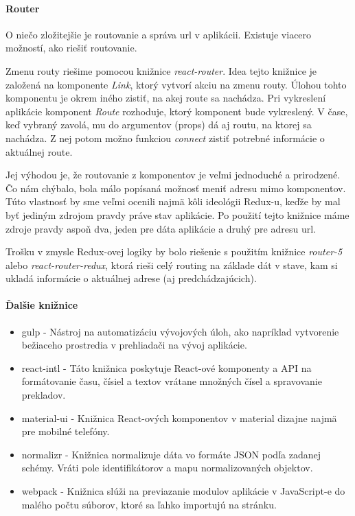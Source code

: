 \paragraph{Router}%
O niečo zložitejšie je routovanie a správa url v aplikácii. Existuje viacero možností, ako riešiť routovanie. 

Zmenu routy riešime pomocou knižnice \emph{react-router}. %
Idea tejto knižnice je založená na komponente \emph{Link}, ktorý vytvorí akciu na zmenu routy. Úlohou tohto komponentu je okrem iného zistiť, na akej route sa nachádza. 
Pri vykreslení aplikácie komponent \emph{Route} rozhoduje, ktorý komponent bude vykreslený. %
V čase, keď vybraný zavolá, mu do argumentov (props)
dá aj routu, na ktorej sa nachádza. Z nej potom možno funkciou \emph{connect} zistiť potrebné informácie o aktuálnej route. %

Jej výhodou je, že routovanie z komponentov je veľmi jednoduché a prirodzené. Čo nám chýbalo, bola málo popísaná možnosť meniť adresu mimo komponentov. Túto vlastnosť by sme veľmi ocenili najmä kôli ideológii Redux-u, keďže by mal byť jediným zdrojom pravdy práve stav aplikácie. Po použití tejto knižnice máme zdroje pravdy aspoň dva, jeden pre dáta aplikácie a druhý pre adresu url. 


Trošku  v zmysle Redux-ovej logiky by bolo riešenie s použitím knižnice \emph{router-5} alebo \emph{react-router-redux}, ktorá rieši celý routing na základe dát v stave, kam si ukladá informácie o aktuálnej adrese (aj predchádzajúcich).

\paragraph{Ďalšie knižnice}
\begin{itemize}
  \item gulp \cite{gulp} - Nástroj na automatizáciu vývojových úloh, ako napríklad vytvorenie bežiaceho prostredia v prehliadači na vývoj aplikácie.
  \item react-intl \cite{intl} - Táto knižnica poskytuje React-ové komponenty a API na formátovanie času, čísiel a textov vrátane množných čísel a spravovanie prekladov.
  \item material-ui \cite{material-ui} - Knižnica React-ových komponentov v material dizajne najmä pre mobilné telefóny. %
  \item normalizr \cite{normalizr} - Knižnica normalizuje dáta vo formáte JSON podľa zadanej schémy. Vráti pole identifikátorov a mapu normalizovaných objektov.
  \item webpack \cite{webpack} - Knižnica slúži na previazanie modulov aplikácie v JavaScript-e do malého počtu súborov, ktoré sa ľahko importujú na stránku.
\end{itemize}